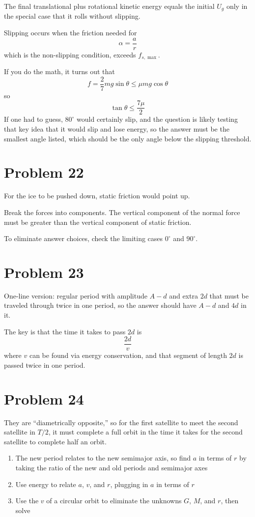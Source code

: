 \documentclass[11pt]{article}
\begin{document}
The final translational plus rotational kinetic energy equals the initial $U_g$ only in the special case that it rolls without slipping.

Slipping occurs when the friction needed for
\[
\alpha=\frac{a}{r}
\]
which is the non-slipping condition, exceeds $f_{s,\max}$.

If you do the math, it turns out that
\[
f=\frac{2}{7}mg\sin\theta\le \mu mg\cos\theta
\]
so
\[
\tan\theta\le \frac{7\mu}{2}
\]
If one had to guess, $80^\circ$ would certainly slip, and the question is likely testing that key idea that it would slip and lose energy, so the answer must be the smallest angle listed, which should be the only angle below the slipping threshold.

\section*{Problem 22}
\hspace*{\parindent} For the ice to be pushed down, static friction would point up.

Break the forces into components. The vertical component of the normal force must be greater than the vertical component of static friction.

To eliminate answer choices, check the limiting cases $0^\circ$ and $90^\circ$.

\section*{Problem 23}
\hspace*{\parindent} One-line version: regular period with amplitude $A-d$ and extra $2d$ that must be traveled through twice in one period, so the answer should have $A-d$ and $4d$ in it.

The key is that the time it takes to pass $2d$ is
\[
\frac{2d}{v}
\]
where $v$ can be found via energy conservation, and that segment of length $2d$ is passed twice in one period.

\section*{Problem 24}
\hspace*{\parindent} They are ``diametrically opposite,'' so for the first satellite to meet the second satellite in $T/2$, it must complete a full orbit in the time it takes for the second satellite to complete half an orbit.

\begin{enumerate}[leftmargin=1.5em,label=\arabic*.,itemsep=0.3em]
    \item The new period relates to the new semimajor axis, so find $a$ in terms of $r$ by taking the ratio of the new and old periods and semimajor axes
    \item Use energy to relate $a$, $v$, and $r$, plugging in $a$ in terms of $r$
    \item Use the $v$ of a circular orbit to eliminate the unknowns $G$, $M$, and $r$, then solve
\end{enumerate}
\end{document}
